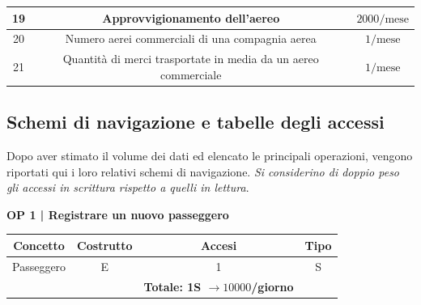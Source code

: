 \begin{tabular}{ | c c c |}
	\hline
	\textsf{\small 19} & \textsf{\small Approvvigionamento dell'aereo} & \textsf{\small $ 2000 / \text{mese} $} \\
	\hline
	\textsf{\small 20} & \textsf{\small Numero aerei commerciali di una compagnia aerea} & \textsf{\small $ 1/ \text{mese} $} \\
	\hline
	\textsf{\small 21} & \textsf{\small Quantità di merci trasportate in media da un aereo commerciale} & \textsf{\small $ 1/ \text{mese} $} \\
	\hline
\end{tabular}



\newpage

\subsection{Schemi di navigazione e tabelle degli accessi}

\textsf{\small Dopo aver stimato il volume dei dati ed elencato le principali operazioni, vengono riportati qui i loro relativi schemi di navigazione. \emph{Si considerino di doppio peso gli accessi in scrittura rispetto a quelli in lettura}.}\break




\textbf{\small OP 1 | Registrare un nuovo passeggero}\\

\begin{tabular}{ c c c c}
	\hline
	\textbf{Concetto} & \textbf{Costrutto} & \textbf{Accesi} & \textbf{Tipo}\\
	\hline
	\textsf{\small Passeggero} & \textsf{\small E} & \textsf{\small 1} &  \textsf{\small S}\\
	\hline
	\textsf{\small } & \textsf{\small } & \textbf{Totale: 1S $\rightarrow 10000$/giorno} \textsf{\small } & \textsf{\small }\\ %
	\hline
\end{tabular}

